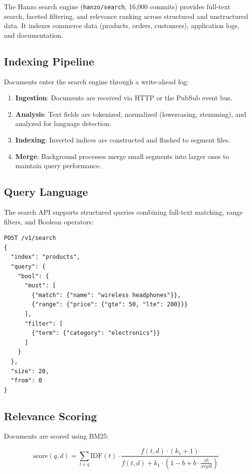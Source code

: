 \documentclass[11pt,a4paper]{article}
\begin{document}
The Hanzo search engine (\texttt{hanzo/search}, 16{,}000 commits) provides full-text search, faceted filtering, and relevance ranking across structured and unstructured data. It indexes commerce data (products, orders, customers), application logs, and documentation.

\subsection{Indexing Pipeline}

Documents enter the search engine through a write-ahead log:

\begin{enumerate}
    \item \textbf{Ingestion}: Documents are received via HTTP or the PubSub event bus.
    \item \textbf{Analysis}: Text fields are tokenized, normalized (lowercasing, stemming), and analyzed for language detection.
    \item \textbf{Indexing}: Inverted indices are constructed and flushed to segment files.
    \item \textbf{Merge}: Background processes merge small segments into larger ones to maintain query performance.
\end{enumerate}

\subsection{Query Language}

The search API supports structured queries combining full-text matching, range filters, and Boolean operators:

\begin{lstlisting}[caption=Search query example.]
POST /v1/search
{
  "index": "products",
  "query": {
    "bool": {
      "must": [
        {"match": {"name": "wireless headphones"}},
        {"range": {"price": {"gte": 50, "lte": 200}}}
      ],
      "filter": [
        {"term": {"category": "electronics"}}
      ]
    }
  },
  "size": 20,
  "from": 0
}
\end{lstlisting}

\subsection{Relevance Scoring}

Documents are scored using BM25:

\begin{equation}
    \text{score}(q, d) = \sum_{t \in q} \text{IDF}(t) \cdot \frac{f(t, d) \cdot (k_1 + 1)}{f(t, d) + k_1 \cdot (1 - b + b \cdot \frac{|d|}{\text{avgdl}})}
\end{equation}
\end{document}
